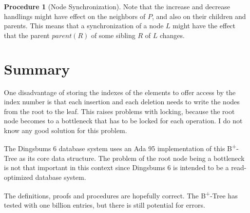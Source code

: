 \documentclass[a4paper, 8pt, twoclumn]{scrartcl}
\theoremstyle{plain}
\theoremstyle{definition}
\newtheorem{proc}[thm]{Procedure}
\theoremstyle{remark}
\newcommand{\BTree}{ B\textsuperscript{+}-Tree }
\begin{document}
\begin{multicols}{2}
\begin{proc}[Node Synchronization]
Note that the increase and decrease handlings might have effect on the
neighbors of $P$, and also on their children and parents.
This means that a synchronization of a node $L$ might have the effect that
the parent $parent(R)$ of some sibling $R$ of $L$ changes.
\end{proc}



\section{Summary}

One disadvantage of storing the indexes of the elements to offer access by
the index number is that each insertion and each deletion needs to write
the nodes from the root to the leaf.
This raises problems with locking, because the root node becomes to a
bottleneck that has to be locked for each operation.
I do not know any good solution for this problem.

The Dingsbums 6 database system uses an Ada 95 implementation of this
\BTree as its core data structure.
The problem of the root node being a bottleneck is not that important in this
context since Dingsbums 6 is intended to be a read-optimized database system.

The definitions, proofs and procedures are hopefully correct.
The \BTree has tested with one billion entries, but there is still potential
for errors.




\end{multicols}
\end{document}
